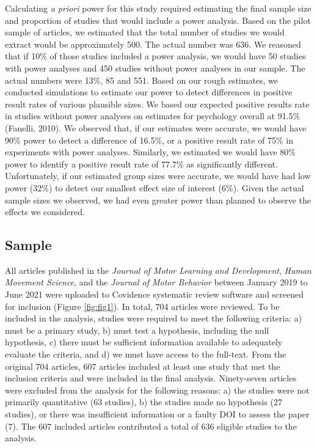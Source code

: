 \documentclass[
  man, donotrepeattitle,mask,floatsintext]{apa7}
\begin{document}
Calculating \emph{a priori} power for this study required estimating the final sample size and proportion of studies that would include a power analysis. Based on the pilot sample of articles, we estimated that the total number of studies we would extract would be approximately 500. The actual number was 636. We reasoned that if 10\% of those studies included a power analysis, we would have 50 studies with power analyses and 450 studies without power analyses in our sample. The actual numbers were 13\%, 85 and 551. Based on our rough estimates, we conducted simulations to estimate our power to detect differences in positive result rates of various plausible sizes. We based our expected positive results rate in studies without power analyses on estimates for psychology overall at 91.5\% (Fanelli, 2010). We observed that, if our estimates were accurate, we would have 90\% power to detect a difference of 16.5\%, or a positive result rate of 75\% in experiments with power analyses. Similarly, we estimated we would have 80\% power to identify a positive result rate of 77.7\% as significantly different. Unfortunately, if our estimated group sizes were accurate, we would have had low power (32\%) to detect our smallest effect size of interest (6\%). Given the actual sample sizes we observed, we had even greater power than planned to observe the effects we considered.

\hypertarget{sample}{%
\subsection{Sample}\label{sample}}

All articles published in the \emph{Journal of Motor Learning and Development}, \emph{Human Movement Science}, and the \emph{Journal of Motor Behavior} between January 2019 to June 2021 were uploaded to Covidence systematic review software and screened for inclusion (Figure \ref{fig:fig1}). In total, 704 articles were reviewed. To be included in the analysis, studies were required to meet the following criteria: a) must be a primary study, b) must test a hypothesis, including the null hypothesis, c) there must be sufficient information available to adequately evaluate the criteria, and d) we must have access to the full-text. From the original 704 articles, 607 articles included at least one study that met the inclusion criteria and were included in the final analysis. Ninety-seven articles were excluded from the analysis for the following reasons: a) the studies were not primarily quantitative (63 studies), b) the studies made no hypothesis (27 studies), or there was insufficient information or a faulty DOI to assess the paper (7). The 607 included articles contributed a total of 636 eligible studies to the analysis.
\end{document}
